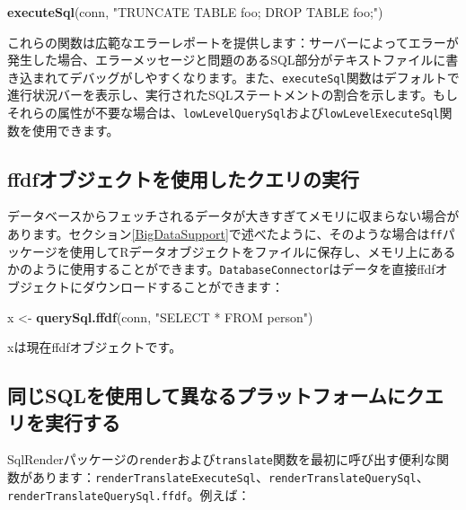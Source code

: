 \documentclass[
  11pt]{book}
\newenvironment{Shaded}{\begin{snugshade}}{\end{snugshade}}
\newcommand{\FunctionTok}[1]{\textcolor[rgb]{0.13,0.29,0.53}{\textbf{#1}}}
\newcommand{\NormalTok}[1]{#1}
\newcommand{\OtherTok}[1]{\textcolor[rgb]{0.56,0.35,0.01}{#1}}
\newcommand{\StringTok}[1]{\textcolor[rgb]{0.31,0.60,0.02}{#1}}
\theoremstyle{definition}
\theoremstyle{definition}
\theoremstyle{definition}
\theoremstyle{definition}
\theoremstyle{remark}
\begin{document}
\begin{Shaded}
\begin{Highlighting}[]
\FunctionTok{executeSql}\NormalTok{(conn, }\StringTok{"TRUNCATE TABLE foo; DROP TABLE foo;"}\NormalTok{)}
\end{Highlighting}
\end{Shaded}

これらの関数は広範なエラーレポートを提供します：サーバーによってエラーが発生した場合、エラーメッセージと問題のあるSQL部分がテキストファイルに書き込まれてデバッグがしやすくなります。また、\texttt{executeSql}関数はデフォルトで進行状況バーを表示し、実行されたSQLステートメントの割合を示します。もしそれらの属性が不要な場合は、\texttt{lowLevelQuerySql}および\texttt{lowLevelExecuteSql}関数を使用できます。

\subsection{ffdfオブジェクトを使用したクエリの実行}\label{ffdfux30aaux30d6ux30b8ux30a7ux30afux30c8ux3092ux4f7fux7528ux3057ux305fux30afux30a8ux30eaux306eux5b9fux884c}

データベースからフェッチされるデータが大きすぎてメモリに収まらない場合があります。セクション\ref{BigDataSupport}で述べたように、そのような場合は\texttt{ff}パッケージを使用してRデータオブジェクトをファイルに保存し、メモリ上にあるかのように使用することができます。\texttt{DatabaseConnector}はデータを直接ffdfオブジェクトにダウンロードすることができます：

\begin{Shaded}
\begin{Highlighting}[]
\NormalTok{x }\OtherTok{\textless{}{-}} \FunctionTok{querySql.ffdf}\NormalTok{(conn, }\StringTok{"SELECT * FROM person"}\NormalTok{)}
\end{Highlighting}
\end{Shaded}

xは現在ffdfオブジェクトです。

\subsection{同じSQLを使用して異なるプラットフォームにクエリを実行する}\label{ux540cux3058sqlux3092ux4f7fux7528ux3057ux3066ux7570ux306aux308bux30d7ux30e9ux30c3ux30c8ux30d5ux30a9ux30fcux30e0ux306bux30afux30a8ux30eaux3092ux5b9fux884cux3059ux308b}

SqlRenderパッケージの\texttt{render}および\texttt{translate}関数を最初に呼び出す便利な関数があります：\texttt{renderTranslateExecuteSql}、\texttt{renderTranslateQuerySql}、\texttt{renderTranslateQuerySql.ffdf}。例えば：
\end{document}
